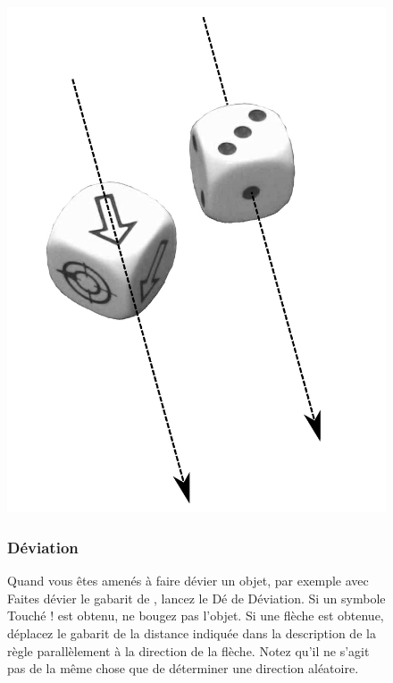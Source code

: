 \begin{figure}[!htbp]
\begin{minipage}[c]{0.3\textwidth}
\includegraphics[width=\textwidth]{pics/deviation_dice.png}
\end{minipage}\hfill
\begin{minipage}[c]{0.67\textwidth}
\subsubsection{Déviation}

Quand vous êtes amenés à faire dévier un objet, par exemple avec \og Faites dévier le gabarit de  \fg{}, lancez le Dé de Déviation. Si un symbole \og Touché ! \fg{} est obtenu, ne bougez pas l'objet. Si une flèche est obtenue, déplacez le gabarit de la distance indiquée dans la description de la règle parallèlement à la direction de la flèche. Notez qu'il ne s'agit pas de la même chose que de déterminer une direction aléatoire.


\end{minipage}
\end{figure}
